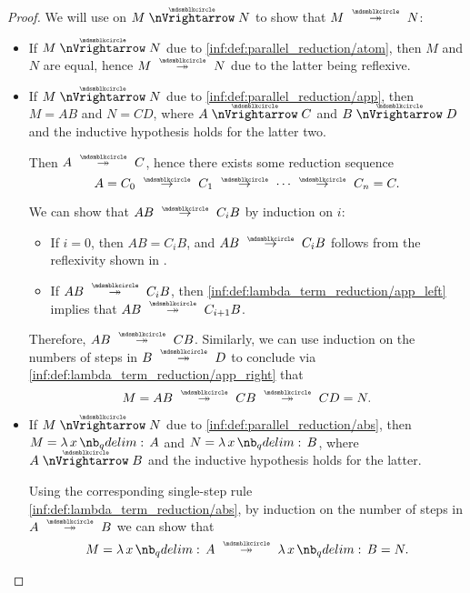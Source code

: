 \begin{proof}
   We will use  on \( M \ppred N \) to show that \( M \pred* N \):
  \begin{itemize}
    \item If \( M \ppred N \) due to \ref{inf:def:parallel_reduction/atom}, then \( M \) and \( N \) are equal, hence \( M \pred* N \) due to the latter being reflexive.

    \item If \( M \ppred N \) due to \ref{inf:def:parallel_reduction/app}, then \( M = AB \) and \( N = CD \), where \( A \ppred C \) and \( B \ppred D \) and the inductive hypothesis holds for the latter two.

    Then \( A \pred* C \), hence there exists some reduction sequence
    \begin{equation*}
      A = C_0 \pred C_1 \pred \cdots \pred C_n = C.
    \end{equation*}

    We can show that \( AB \pred C_i B \) by induction on \( i \):
    \begin{itemize}
      \item If \( i = 0 \), then \( AB = C_i B \), and \( AB \pred C_i B \) follows from the reflexivity shown in .

      \item If \( AB \pred* C_i B \), then \ref{inf:def:lambda_term_reduction/app_left} implies that \( AB \pred* C_{i+1} B \).
    \end{itemize}

    Therefore, \( AB \pred* CB \). Similarly, we can use induction on the numbers of steps in \( B \pred* D \) to conclude via \ref{inf:def:lambda_term_reduction/app_right} that
    \begin{equation*}
      M = AB \pred* CB \pred* CD = N.
    \end{equation*}

    \item If \( M \ppred N \) due to \ref{inf:def:parallel_reduction/abs}, then \( M = \qabs x A \) and \( N = \qabs x B \), where \( A \ppred B \) and the inductive hypothesis holds for the latter.

    Using the corresponding single-step rule \ref{inf:def:lambda_term_reduction/abs}, by induction on the number of steps in \( A \pred* B \) we can show that
    \begin{equation*}
      M = \qabs x A \pred* \qabs x B = N.
    \end{equation*}


\end{itemize}
\end{proof}
